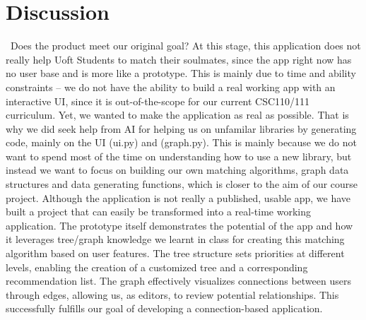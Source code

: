 \documentclass[fontsize=11pt]{article}
\begin{document}
\section{Discussion}
\ Does the product meet our original goal?
At this stage, this application does not really help Uoft Students to match their soulmates, since the app right now has no user base and is more like a prototype.
This is mainly due to time and ability constraints -- we do not have the ability to build a real working app with an interactive UI, since it is out-of-the-scope for our current CSC110/111 curriculum. Yet, we wanted to make the application as real as possible. That is why we did seek help from AI for helping us on unfamilar libraries by generating code, mainly on the UI (ui.py) and (graph.py). This is mainly because we do not want to spend most of the time on understanding how to use a new library, but instead we want to focus on building our own matching algorithms, graph data structures and data generating functions, which is closer to the aim of our course project.
Although the application is not really a published, usable app, we have built a project that can easily be transformed into a real-time working application. The prototype itself demonstrates the potential of the app and how it leverages tree/graph knowledge we learnt in class for creating this matching algorithm based on user features. The tree structure sets priorities at different levels, enabling the creation of a customized tree and a corresponding recommendation list. The graph effectively visualizes connections between users through edges, allowing us, as editors, to review potential relationships.
This successfully fulfills our goal of developing a connection-based application.
\end{document}
